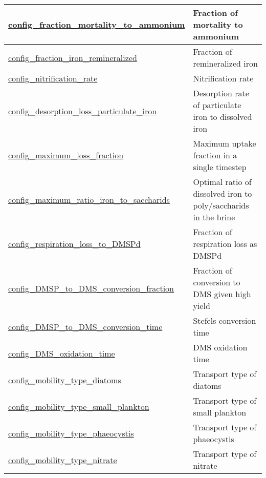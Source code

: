 {\begin{center}
\begin{longtable}{| p{2.0in} || p{4.0in} |}
    \hline
    \hyperref[subsec:nm_sec_config_fraction_mortality_to_ammonium]{config\_fraction\_mortality\_to\_\-ammonium} & Fraction of mortality to ammonium \\
    \hline
    \hyperref[subsec:nm_sec_config_fraction_iron_remineralized]{config\_fraction\_iron\_\-remineralized} & Fraction of remineralized iron  \\
    \hline
    \hyperref[subsec:nm_sec_config_nitrification_rate]{config\_nitrification\_rate} & Nitrification rate \\
    \hline
    \hyperref[subsec:nm_sec_config_desorption_loss_particulate_iron]{config\_desorption\_loss\_\-particulate\_iron} & Desorption rate of particulate iron to dissolved iron \\
    \hline
    \hyperref[subsec:nm_sec_config_maximum_loss_fraction]{config\_maximum\_loss\_fraction} & Maximum uptake fraction in a single timestep \\
    \hline
    \hyperref[subsec:nm_sec_config_maximum_ratio_iron_to_saccharids]{config\_maximum\_ratio\_iron\_\-to\_saccharids} & Optimal ratio of dissolved iron to poly/saccharids in the brine \\
    \hline
    \hyperref[subsec:nm_sec_config_respiration_loss_to_DMSPd]{config\_respiration\_loss\_to\_\-DMSPd} & Fraction of respiration loss as DMSPd \\
    \hline
    \hyperref[subsec:nm_sec_config_DMSP_to_DMS_conversion_fraction]{config\_DMSP\_to\_DMS\_\-conversion\_fraction} & Fraction of conversion to DMS given high yield \\
    \hline
    \hyperref[subsec:nm_sec_config_DMSP_to_DMS_conversion_time]{config\_DMSP\_to\_DMS\_\-conversion\_time} & Stefels conversion time \\
    \hline
    \hyperref[subsec:nm_sec_config_DMS_oxidation_time]{config\_DMS\_oxidation\_time} & DMS oxidation time \\
    \hline
    \hyperref[subsec:nm_sec_config_mobility_type_diatoms]{config\_mobility\_type\_diatoms} & Transport type of diatoms \\
    \hline
    \hyperref[subsec:nm_sec_config_mobility_type_small_plankton]{config\_mobility\_type\_small\_\-plankton} & Transport type of small plankton \\
    \hline
    \hyperref[subsec:nm_sec_config_mobility_type_phaeocystis]{config\_mobility\_type\_\-phaeocystis} & Transport type of phaeocystis \\
    \hline
    \hyperref[subsec:nm_sec_config_mobility_type_nitrate]{config\_mobility\_type\_nitrate} & Transport type of nitrate \\

\end{longtable}
\end{center}}
